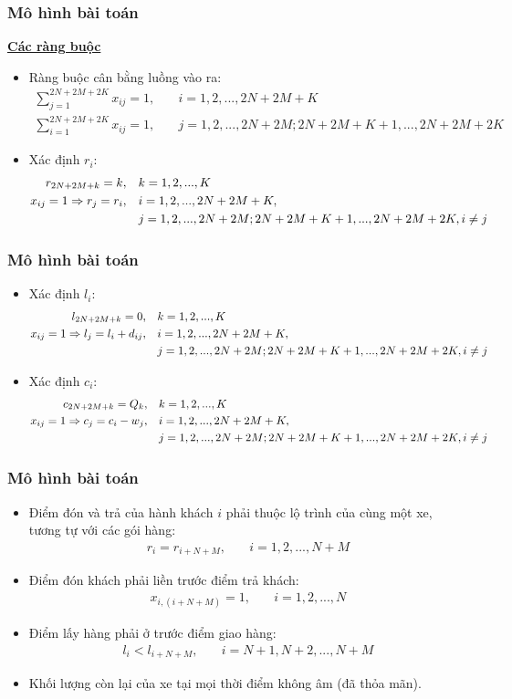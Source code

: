 \documentclass{beamer}
\begin{document}
	\begin{frame}
		\frametitle{Mô hình bài toán}
		\textbf{\underline{Các ràng buộc}}
		\begin{itemize}
			\item Ràng buộc cân bằng luồng vào ra:
			\begin{align}
				\sum_{j=1}^{2N+2M+2K} x_{ij} = 1,\quad & i=1,2,...,2N+2M+K \\
				\sum_{i=1}^{2N+2M+2K} x_{ij} = 1,\quad & j=1,2,...,2N+2M;2N+2M+K+1,...,2N+2M+2K
			\end{align}
			\item Xác định $r_i$:
			\begin{align}
				r_{2N+2M+k} = k,\quad & k=1,2,...,K \\
				x_{ij}=1\Rightarrow r_j=r_i,\quad & i=1,2,...,2N+2M+K, \\
				& j=1,2,...,2N+2M;2N+2M+K+1,...,2N+2M+2K, i\ne j \notag
			\end{align}
		\end{itemize}
	\end{frame}
	\begin{frame}
		\frametitle{Mô hình bài toán}
		\begin{itemize}
			\item Xác định $l_i$:
			\begin{align}
				l_{2N+2M+k} = 0,\quad & k=1,2,...,K \\
				x_{ij}=1\Rightarrow l_j=l_i + d_{ij},\quad & i=1,2,...,2N+2M+K, \\
				& j=1,2,...,2N+2M;2N+2M+K+1,...,2N+2M+2K,i\ne j \notag
			\end{align}
			\item Xác định $c_i$:
			\begin{align}
				c_{2N+2M+k} = Q_k,\quad & k=1,2,...,K \\
				x_{ij}=1\Rightarrow c_j=c_i - w_j,\quad & i=1,2,...,2N+2M+K, \\
				& j=1,2,...,2N+2M;2N+2M+K+1,...,2N+2M+2K,i\ne j \notag
			\end{align}
		\end{itemize}
	\end{frame}
	\begin{frame}
		\frametitle{Mô hình bài toán}
		\begin{itemize}
			\item Điểm đón và trả của hành khách $i$ phải thuộc lộ trình của cùng một xe, tương tự với các gói hàng:
			\begin{align}
				r_i = r_{i+N+M},\quad & i=1,2,...,N+M
			\end{align}
			\item Điểm đón khách phải liền trước điểm trả khách:
			\begin{align}
				x_{i,(i+N+M)} = 1,\quad & i=1,2,...,N
			\end{align}
			\item Điểm lấy hàng phải ở trước điểm giao hàng:
			\begin{align}
				l_i < l_{i+N+M},\quad & i=N+1,N+2,...,N+M
			\end{align}
			\item Khối lượng còn lại của xe tại mọi thời điểm không âm (đã thỏa mãn).
		\end{itemize}
	\end{frame}
\end{document}
